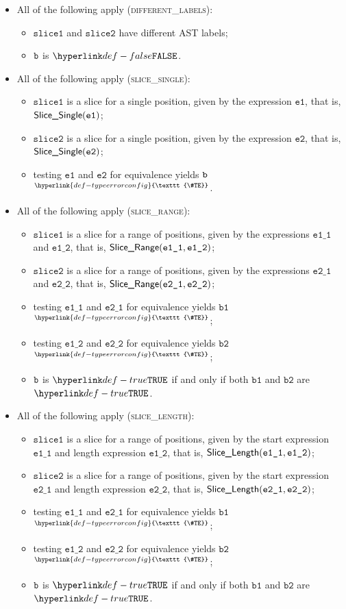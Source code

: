 \documentclass{book}
\newcommand\TypeErrorConfig[0]{\hyperlink{def-typeerrorconfig}{\texttt{\#TE}}}
\newcommand\ProseOrTypeError[0]{\hyperlink{def-proseortypeerror}{$^{\TypeErrorConfig}$}}
\newcommand\veone[0]{\texttt{e1}}
\newcommand\vetwo[0]{\texttt{e2}}
\newcommand\veoneone[0]{\texttt{e1\_1}}
\newcommand\veonetwo[0]{\texttt{e1\_2}}
\newcommand\vetwoone[0]{\texttt{e2\_1}}
\newcommand\vetwotwo[0]{\texttt{e2\_2}}
\newcommand\vbone[0]{\texttt{b1}}
\newcommand\vbtwo[0]{\texttt{b2}}
\newcommand\sliceone[0]{\texttt{slice1}}
\newcommand\slicetwo[0]{\texttt{slice2}}
\begin{document}
\begin{itemize}
  \item All of the following apply (\textsc{different\_labels}):
  \begin{itemize}
    \item $\sliceone$ and $\slicetwo$ have different AST labels;
    \item $\texttt{b}$ is $\False$.
  \end{itemize}

  \item All of the following apply (\textsc{slice\_single}):
  \begin{itemize}
    \item $\sliceone$ is a slice for a single position, given by the expression $\veone$, that is, $\SliceSingle(\veone)$;
    \item $\slicetwo$ is a slice for a single position, given by the expression $\vetwo$, that is, $\SliceSingle(\vetwo)$;
    \item testing $\veone$ and $\vetwo$ for equivalence yields $\texttt{b}$ \ProseOrTypeError.
  \end{itemize}

  \item All of the following apply (\textsc{slice\_range}):
  \begin{itemize}
    \item $\sliceone$ is a slice for a range of positions, given by the expressions $\veoneone$ and $\veonetwo$, that is, $\SliceRange(\veoneone, \veonetwo)$;
    \item $\slicetwo$ is a slice for a range of positions, given by the expressions $\vetwoone$ and $\vetwotwo$, that is, $\SliceRange(\vetwoone, \vetwotwo)$;
    \item testing $\veoneone$ and $\vetwoone$ for equivalence yields $\vbone$ \ProseOrTypeError;
    \item testing $\veonetwo$ and $\vetwotwo$ for equivalence yields $\vbtwo$ \ProseOrTypeError;
    \item $\texttt{b}$ is $\True$ if and only if both $\vbone$ and $\vbtwo$ are $\True$.
  \end{itemize}

  \item All of the following apply (\textsc{slice\_length}):
  \begin{itemize}
    \item $\sliceone$ is a slice for a range of positions, given by the start expression $\veoneone$ and length expression $\veonetwo$, that is, $\SliceLength(\veoneone, \veonetwo)$;
    \item $\slicetwo$ is a slice for a range of positions, given by the start expression $\vetwoone$ and length expression $\vetwotwo$, that is, $\SliceLength(\vetwoone, \vetwotwo)$;
    \item testing $\veoneone$ and $\vetwoone$ for equivalence yields $\vbone$ \ProseOrTypeError;
    \item testing $\veonetwo$ and $\vetwotwo$ for equivalence yields $\vbtwo$ \ProseOrTypeError;
    \item $\texttt{b}$ is $\True$ if and only if both $\vbone$ and $\vbtwo$ are $\True$.
  \end{itemize}
\end{itemize}
\end{document}
